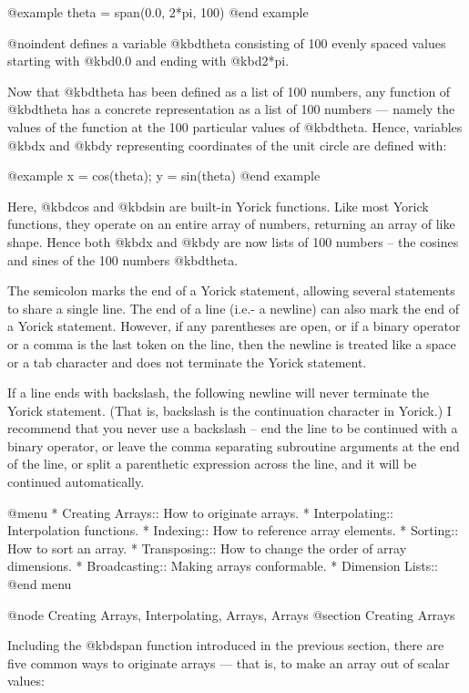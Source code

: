 @example
theta = span(0.0, 2*pi, 100)
@end example

@noindent
defines a variable @kbd{theta} consisting of 100 evenly spaced values
starting with @kbd{0.0} and ending with @kbd{2*pi}.

Now that @kbd{theta} has been defined as a list of 100 numbers, any
function of @kbd{theta} has a concrete representation as a list of 100
numbers --- namely the values of the function at the 100 particular
values of @kbd{theta}.  Hence, variables @kbd{x} and @kbd{y}
representing coordinates of the unit circle are defined with:

@example
x = cos(theta);   y = sin(theta)
@end example

Here, @kbd{cos} and @kbd{sin} are built-in Yorick functions.  Like most
Yorick functions, they operate on an entire array of numbers, returning
an array of like shape.  Hence both @kbd{x} and @kbd{y} are now lists of
100 numbers -- the cosines and sines of the 100 numbers
@kbd{theta}.

The semicolon marks the end of a Yorick statement, allowing several
statements to share a single line.  The end of a line (i.e.- a newline)
can also mark the end of a Yorick statement.  However, if any
parentheses are open, or if a binary operator or a comma is the last
token on the line, then the newline is treated like a space or a tab
character and does not terminate the Yorick statement.

If a line ends with backslash, the following newline will never
terminate the Yorick statement.  (That is, backslash is the continuation
character in Yorick.)  I recommend that you never use a backslash -- end
the line to be continued with a binary operator, or leave the comma
separating subroutine arguments at the end of the line, or split a
parenthetic expression across the line, and it will be continued
automatically.

@menu
* Creating Arrays::             How to originate arrays.
* Interpolating::               Interpolation functions.
* Indexing::                    How to reference array elements.
* Sorting::                     How to sort an array.
* Transposing::                 How to change the order of array dimensions.
* Broadcasting::                Making arrays conformable.
* Dimension Lists::             
@end menu

@node    Creating Arrays, Interpolating, Arrays, Arrays
@section Creating Arrays

Including the @kbd{span} function introduced in the previous section,
there are five common ways to originate arrays --- that is, to make an
array out of scalar values:

